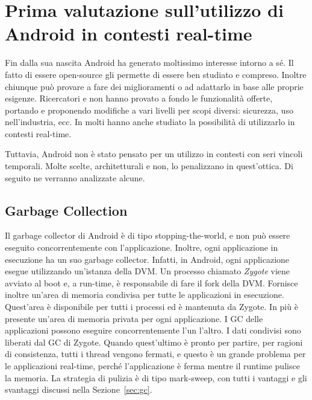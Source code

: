 \section{Prima valutazione sull'utilizzo di Android in contesti real-time}
Fin dalla sua nascita Android ha generato moltissimo interesse intorno a sé. Il fatto di essere open-source gli permette di essere ben studiato e compreso. Inoltre chiunque può provare a fare dei miglioramenti o ad adattarlo in base alle proprie esigenze. Ricercatori e non hanno provato a fondo le funzionalità offerte, portando e proponendo modifiche a vari livelli per scopi diversi: sicurezza, uso nell'industria, ecc. In molti hanno anche studiato la possibilità di utilizzarlo in contesti real-time. 

Tuttavia, Android non è stato pensato per un utilizzo in contesti con seri vincoli temporali. Molte scelte, architetturali e non, lo penalizzano in quest'ottica. Di seguito ne verranno analizzate alcune.

\subsection{Garbage Collection} \label{sec:gcandroid}
Il garbage collector di Android è di tipo stopping-the-world, e non può essere eseguito concorrentemente con l'applicazione. Inoltre, ogni applicazione in esecuzione ha un suo garbage collector. Infatti, in Android, ogni applicazione esegue utilizzando un'istanza della DVM. Un processo chiamato \textit{Zygote} viene avviato al boot e, a run-time, è responsabile di fare il fork della DVM. Fornisce inoltre un'area di memoria condivisa per tutte le applicazioni in esecuzione. Quest'area è disponibile per tutti i processi ed è mantenuta da Zygote. In più è presente un'area di memoria privata per ogni applicazione. I GC delle applicazioni possono eseguire concorrentemente l'un l'altro. I dati condivisi sono liberati dal GC di Zygote. Quando quest'ultimo è pronto per partire, per ragioni di consistenza, tutti i thread vengono fermati, e questo è un grande problema per le applicazioni real-time, perché l'applicazione è ferma mentre il runtime pulisce la memoria. La strategia di pulizia è di tipo mark-sweep, con tutti i vantaggi e gli svantaggi discussi nella Sezione~\ref{sec:gc}.

